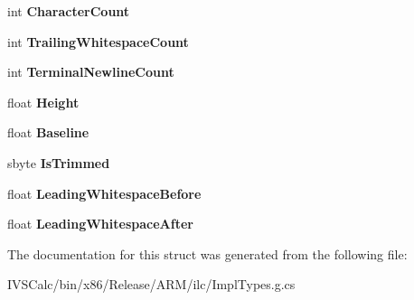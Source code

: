\begin{DoxyCompactItemize}
\item 
\mbox{\label{struct_microsoft_1_1_graphics_1_1_canvas_1_1_text_1_1_canvas_line_metrics_____impl_1_1_unsafe_type_aeee4bcd0c596227e6b0ad4ea4b564a59}} 
int {\bfseries Character\+Count}
\item 
\mbox{\label{struct_microsoft_1_1_graphics_1_1_canvas_1_1_text_1_1_canvas_line_metrics_____impl_1_1_unsafe_type_a6730db963510e5d32af2dd3459e4a19c}} 
int {\bfseries Trailing\+Whitespace\+Count}
\item 
\mbox{\label{struct_microsoft_1_1_graphics_1_1_canvas_1_1_text_1_1_canvas_line_metrics_____impl_1_1_unsafe_type_a6333dfb4523806d516ca296c34121483}} 
int {\bfseries Terminal\+Newline\+Count}
\item 
\mbox{\label{struct_microsoft_1_1_graphics_1_1_canvas_1_1_text_1_1_canvas_line_metrics_____impl_1_1_unsafe_type_a4408ec9f5359b675c1fb02818b0c74b0}} 
float {\bfseries Height}
\item 
\mbox{\label{struct_microsoft_1_1_graphics_1_1_canvas_1_1_text_1_1_canvas_line_metrics_____impl_1_1_unsafe_type_aab129eec31c880445917b5fca913d928}} 
float {\bfseries Baseline}
\item 
\mbox{\label{struct_microsoft_1_1_graphics_1_1_canvas_1_1_text_1_1_canvas_line_metrics_____impl_1_1_unsafe_type_af61146a7f7a9270acbae9543a57726e8}} 
sbyte {\bfseries Is\+Trimmed}
\item 
\mbox{\label{struct_microsoft_1_1_graphics_1_1_canvas_1_1_text_1_1_canvas_line_metrics_____impl_1_1_unsafe_type_ad0d069bf70ab297b48d12ed718ed0451}} 
float {\bfseries Leading\+Whitespace\+Before}
\item 
\mbox{\label{struct_microsoft_1_1_graphics_1_1_canvas_1_1_text_1_1_canvas_line_metrics_____impl_1_1_unsafe_type_ac2416b88a5eb89a79e43437ebe4ba142}} 
float {\bfseries Leading\+Whitespace\+After}
\end{DoxyCompactItemize}


The documentation for this struct was generated from the following file\+:\begin{DoxyCompactItemize}
\item 
I\+V\+S\+Calc/bin/x86/\+Release/\+A\+R\+M/ilc/Impl\+Types.\+g.\+cs\end{DoxyCompactItemize}
